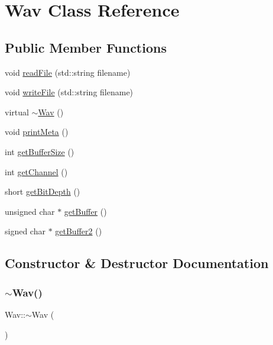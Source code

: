 \hypertarget{classWav}{}\section{Wav Class Reference}
\label{classWav}
\subsection*{Public Member Functions}
\begin{DoxyCompactItemize}
\item 
void \hyperlink{classWav_a691dd4fbe69185828a92a5b51ab80267}{read\+File} (std\+::string filename)
\item 
void \hyperlink{classWav_a6d6641b1934a56113c9611e00b27fba8}{write\+File} (std\+::string filename)
\item 
virtual \hyperlink{classWav_a1510b246ba121b103a60b8e7839af25f}{$\sim$\+Wav} ()
\item 
void \hyperlink{classWav_abfa4f9851327536ab574fd465eaf4fb2}{print\+Meta} ()
\item 
int \hyperlink{classWav_a11de10cb698ea0ea08f3a28580f21b39}{get\+Buffer\+Size} ()
\item 
int \hyperlink{classWav_a271d6ddb273af4e9bd8005f43c2e1c9c}{get\+Channel} ()
\item 
short \hyperlink{classWav_a7620ba9a7653b718ac96f11ff4e453f3}{get\+Bit\+Depth} ()
\item 
unsigned char $\ast$ \hyperlink{classWav_a2daf07a90ed34789e3a1874973d9bd36}{get\+Buffer} ()
\item 
signed char $\ast$ \hyperlink{classWav_acfc2d513023f780f716bf3ed35a7ec44}{get\+Buffer2} ()
\end{DoxyCompactItemize}


\subsection{Constructor \& Destructor Documentation}
\mbox{\label{classWav_a1510b246ba121b103a60b8e7839af25f}} 
\subsubsection{\texorpdfstring{$\sim$\+Wav()}{~Wav()}}
{\footnotesize\ttfamily Wav\+::$\sim$\+Wav (\begin{DoxyParamCaption}{ }\end{DoxyParamCaption})\hspace{0.3cm}{\ttfamily [virtual]}}

